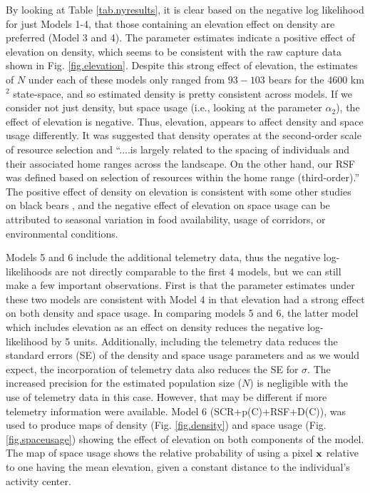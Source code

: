 By looking at Table \ref{tab.nyresults}, it is clear based on the
negative log likelihood for just Models 1-4, that those containing an
elevation effect on density are preferred (Model 3 and 4).  The
parameter estimates indicate a positive effect of elevation on
density, which seems to be consistent with the raw capture data shown
in Fig. \ref{fig.elevation}.  Despite this strong effect
of elevation, the estimates of $N$ under each of these models only
ranged from $93 - 103$ bears for the 4600 km$^2$ state-space, and so
estimated density is pretty consistent across models. 
  If we
consider not just density, but space usage (i.e., looking at the
parameter $\alpha_2$), the effect of elevation is negative.  Thus, elevation, appears to affect density and space usage
differently.  It was suggested that density operates at the
second-order scale of resource selection and ``....is largely related
to the spacing of individuals and their associated home ranges across
the landscape.  On the other hand, our RSF was defined based on
selection of resources within the home range (third-order).''
\citep{royle_etal:2012mee} 
The positive effect of density on elevation
is consistent with some other studies on black bears \citep[e.g.][]{frary_etal:2011},
and the negative effect of elevation on space usage can be attributed to
seasonal variation in food availability, usage of corridors, or
environmental conditions.


Models 5 and 6 include the additional telemetry data, thus the
negative log-likelihoods are not directly comparable to the first 4
models, but we can still make a few important observations.  First is
that the parameter estimates under these two models are consistent
with Model 4 in that elevation had a strong effect on both density and
space usage.  In comparing models 5 and 6, the latter model which
includes elevation as an effect on density reduces the negative
log-likelihood by 5 units.  Additionally, including the telemetry data
reduces the standard errors (SE) of the density and space usage
parameters and as we would expect, the incorporation of telemetry data
also reduces the SE for $\sigma$.  The increased precision for the
estimated population size ($N$) is negligible with the use of
telemetry data in this case.  However, that may be different if more
telemetry information were available.  Model 6 (SCR+p(C)+RSF+D(C)),
was used to produce maps of density (Fig. \ref{fig.density}) and space
usage (Fig. \ref{fig.spaceusage}) showing the effect of elevation on
both components of the model.  The map of space usage shows the
relative probability of using a pixel ${\bf x}$ relative to one having
the mean elevation, given a constant distance to the individual's
activity center.



